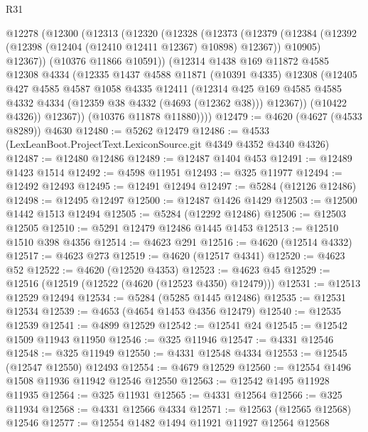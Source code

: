 \begin{lexlean}{R31}
\begin{coremodule}
    @12278
      (@12300
        (@12313
          (@12320
            (@12328
              (@12373
                (@12379
                  (@12384 (@12392 (@12398 (@12404 (@12410 @12411 @12367) @10898) @12367)) @10905)
                  @12367))
              (@10376 @11866 @10591))
            (@12314
              @1438
              @169
              @11872
              @4585
              @12308
              @4334
              (@12335
                @1437
                @4588
                @11871
                (@10391 @4335)
                @12308
                (@12405
                  @427
                  @4585
                  @4587
                  @1058
                  @4335
                  @12411
                  (@12314
                    @425
                    @169
                    @4585
                    @4585
                    @4332
                    @4334
                    (@12359 @38 @4332 (@4693 (@12362 @38)))
                    @12367))
                (@10422 @4326))
              @12367))
          (@10376 @11878 @11880))))
@12479 := @4620 (@4627 (@4533 @8289)) @4630
@12480 := @5262 @12479
@12486 := @4533 (LexLeanBoot.ProjectText.LexiconSource.git @4349 @4352 @4340 @4326)
@12487 := @12480 @12486
@12489 := @12487 @1404 @453
@12491 := @12489 @1423 @1514
@12492 := @4598 @11951
@12493 := @325 @11977
@12494 := @12492 @12493
@12495 := @12491 @12494
@12497 := @5284 (@12126 @12486)
@12498 := @12495 @12497
@12500 := @12487 @1426 @1429
@12503 := @12500 @1442 @1513 @12494
@12505 := @5284 (@12292 @12486)
@12506 := @12503 @12505
@12510 := @5291 @12479 @12486 @1445 @1453
@12513 := @12510 @1510 @398 @4356
@12514 := @4623 @291
@12516 := @4620 (@12514 @4332)
@12517 := @4623 @273
@12519 := @4620 (@12517 @4341)
@12520 := @4623 @52
@12522 := @4620 (@12520 @4353)
@12523 := @4623 @45
@12529 := @12516 (@12519 (@12522 (@4620 (@12523 @4350) @12479)))
@12531 := @12513 @12529 @12494
@12534 := @5284 (@5285 @1445 @12486)
@12535 := @12531 @12534
@12539 := @4653 (@4654 @1453 @4356 @12479)
@12540 := @12535 @12539
@12541 := @4899 @12529
@12542 := @12541 @24
@12545 := @12542 @1509 @11943 @11950
@12546 := @325 @11946
@12547 := @4331 @12546
@12548 := @325 @11949
@12550 := @4331 @12548 @4334
@12553 := @12545 (@12547 @12550) @12493
@12554 := @4679 @12529
@12560 := @12554 @1496 @1508 @11936 @11942 @12546 @12550
@12563 := @12542 @1495 @11928 @11935
@12564 := @325 @11931
@12565 := @4331 @12564
@12566 := @325 @11934
@12568 := @4331 @12566 @4334
@12571 := @12563 (@12565 @12568) @12546
@12577 := @12554 @1482 @1494 @11921 @11927 @12564 @12568

\end{coremodule}
\end{lexlean}
